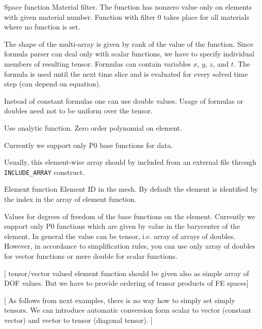 \begin{recordtype}{Space function}{}
Material filter. The function has nonzero value only on elements with given material number. 
Function with filter $0$ takes place for all materials where no function is set.

The shape of the multi-array is given by 
rank of the value of the function. Since formula parser can deal only with scalar functions, we
have to specify individual members of resulting tensor. Formulas can contain variables $x$, $y$, $z$, and $t$. 
The formula is used until the next time slice and is evaluated for every solved time step (can depend on equation).

Instead of constant formulas one can use double values.
Usage of formulas or doubles need not to be uniform over the tensor.


   Use analytic function.
   Zero order polynomial on element.

Currently we support only P0 base functions for data.

Usually, this element-wise array should by included from an external file through \verb'INCLUDE_ARRAY' construct.

\end{recordtype}

\begin{recordtype}{Element function}{}
Element ID in the mesh. By default the element is 
identified by the index in the array of element function.

Values for degrees of freedom of the base functions on the element. Currently we support 
only P0 functions which are given by value in the barycenter of the element. 
In general the value can be tensor, i.e. array of arrays of doubles.
However, in accordance to simplification rules, you can use only array of doubles for 
vector functions or mere double for scalar functions.
\end{recordtype}

[ tensor/vector valued element function should be given also as simple array of DOF values. But
  we have to provide ordering of tensor products of FE spaces]

[ As follows from next examples, there is no way how to simply set simply tensors.  We can introduce automatic conversion form scalar to  vector (constant vector) and vector to tensor 
(diagonal tensor). ]

